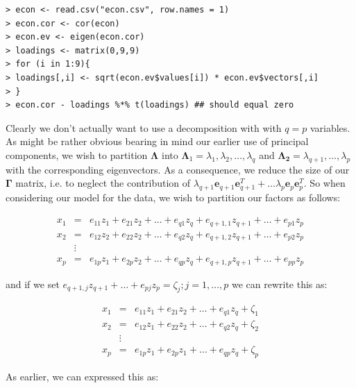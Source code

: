 \singlespacing
\begin{verbatim}
> econ <- read.csv("econ.csv", row.names = 1)
> econ.cor <- cor(econ)
> econ.ev <- eigen(econ.cor)
> loadings <- matrix(0,9,9)
> for (i in 1:9){
> loadings[,i] <- sqrt(econ.ev$values[i]) * econ.ev$vectors[,i]
> }
> econ.cor - loadings %*% t(loadings) ## should equal zero
\end{verbatim}
\onehalfspacing



Clearly we don't actually want to use a decomposition with with $q=p$ variables.   As might be rather obvious bearing in mind our earlier use of principal components, we wish to partition $\boldsymbol{\Lambda}$ into $\boldsymbol{\Lambda}_{1} = \lambda_{1}, \lambda_{2}, \ldots, \lambda_{q}$ and $\boldsymbol{\Lambda_{2}} = \lambda_{q+1}, \ldots, \lambda_{p}$ with the corresponding eigenvectors.   As a consequence, we reduce the size of our $\boldsymbol{\Gamma}$ matrix, i.e. to neglect the contribution of  $\lambda_{q+1} \boldsymbol{e}_{q+1} \boldsymbol{e}_{q+1}^{T} + \ldots  \lambda_{p} \boldsymbol{e}_{p} \boldsymbol{e}_{p}^{T}$.   So when considering our model for the data, we wish to partition our factors as follows:

\begin{eqnarray*}
x_{1} &=& e_{11}z_{1} + e_{21} z_{2}  + \ldots + e_{q1} z_{q} +  e_{q+1,1} z_{q+1} + \ldots +  e_{p1} z_{p} \\
x_{2} &=& e_{12}z_{2} + e_{22} z_{2} + \ldots + e_{q2} z_{q} +  e_{q+1,2} z_{q+1} + \ldots + e_{p2} z_{p} \\
&\vdots& \\
x_{p} &=& e_{1p}z_{1} + e_{2p} z_{2} + \ldots + e_{qp} z_{q} + e_{q+1,p} z_{q+1} + \ldots + e_{pp} z_{p} 
\end{eqnarray*}

and if we set $ e_{q+1,j} z_{q+1} + \ldots +  e_{pj} z_{p} = \zeta_{j}; j = 1, \ldots, p$ we can rewrite this as:


\begin{eqnarray*}
x_{1} &=& e_{11} z_{1} + e_{21} z_{2} + \ldots + e_{q1} z_{q} +  \zeta_{1}\\
x_{2} &=& e_{12} z_{1} + e_{22} z_{2} + \ldots + e_{q2} z_{q} +  \zeta_{2}\\
&\vdots& \\
x_{p} &=& e_{1p} z_{1} + e_{2p} z_{1} + \ldots + e_{qp} z_{q} + \zeta_{p}
\end{eqnarray*}

As earlier, we can expressed this as:

